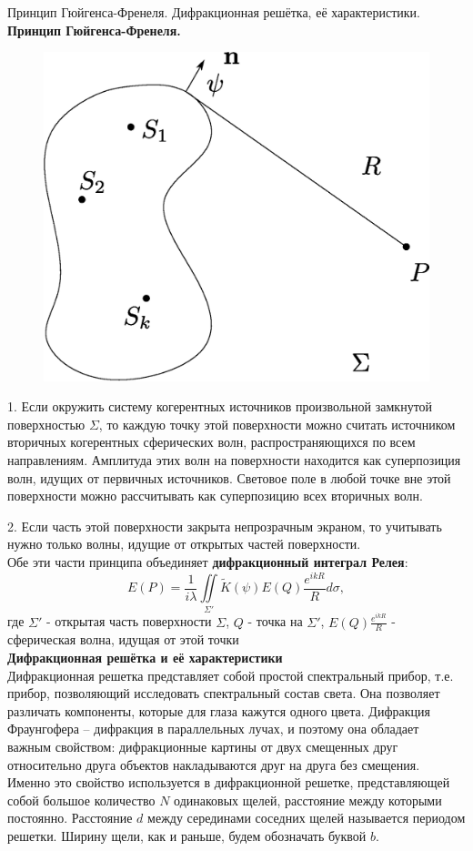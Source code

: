 \documentclass[__main__.tex]{subfiles}
\begin{document}
Принцип Гюйгенса-Френеля. Дифракционная решётка, её характеристики.\\ 

\textbf{Принцип Гюйгенса-Френеля. }\\

\begin{figure}[h]
	\begin{center}
		\includegraphics[width=0.5\linewidth]{img/o-08_1.eps}
	\end{center}
\end{figure}

1. Если окружить систему когерентных источников произвольной замкнутой поверхностью $\Sigma$, то каждую точку этой поверхности можно считать источником вторичных когерентных сферических волн, распространяющихся по всем направлениям. Амплитуда этих волн на поверхности находится как суперпозиция волн, идущих от первичных источников. Световое поле в любой точке вне этой поверхности можно рассчитывать как суперпозицию всех вторичных волн. 

2. Если часть этой поверхности закрыта непрозрачным экраном, то учитывать нужно только волны, идущие от открытых частей поверхности.\\

Обе эти части принципа объединяет \textbf{дифракционный интеграл Релея}:
$$E(P) = \frac{1}{i\lambda}\iint\limits_{\Sigma'} \widetilde K(\psi) E(Q)\frac{e^{ikR}}{R}d\sigma,$$
где $\Sigma'$ - открытая часть поверхности $\Sigma$, $Q$ - точка на $\Sigma'$, $E(Q)\frac{e^{ikR}}{R}$ - сферическая волна, идущая от этой точки\\ 
\textbf{Дифракционная решётка и её характеристики}\\

Дифракционная решетка представляет собой простой спектральный прибор, т.е. прибор, позволяющий исследовать спектральный состав света. Она позволяет различать компоненты, которые для глаза кажутся одного цвета.
Дифракция Фраунгофера – дифракция в параллельных лучах, и поэтому она обладает важным свойством: дифракционные картины от двух смещенных друг относительно друга объектов накладываются друг на друга без смещения. Именно это свойство используется в дифракционной решетке, представляющей собой большое количество $N$ одинаковых щелей, расстояние между которыми постоянно. Расстояние  $d$  между серединами соседних щелей называется периодом решетки. Ширину щели, как и раньше, будем обозначать буквой $b$.
\end{document}
